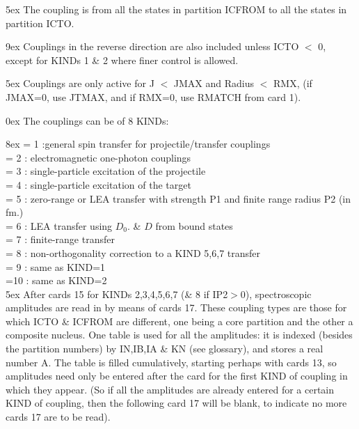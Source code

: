 \documentclass[11pt]{article}
\begin{document}
\hangindent 5ex
The coupling is from all the states in partition ICFROM
to all the states in partition ICTO.

\hangindent 9ex
Couplings in the reverse direction are also included unless
ICTO $<$ 0, except for KINDs 1 \& 2 where finer control is allowed.

\hangindent 5ex
Couplings are only active for J $<$ JMAX and Radius $<$ RMX,
(if JMAX=0, use JTMAX, and if RMX=0, use  RMATCH from card 1).

\bigskip

\hangindent 0ex
The couplings can be of 8 KINDs:

\hangindent 8ex
            = 1 :general spin transfer for projectile/transfer couplings\\
            = 2 :  electromagnetic one-photon couplings\\
            = 3 : single-particle excitation of the projectile\\
            = 4 : single-particle excitation of the target\\
            = 5 : zero-range or LEA transfer with strength P1 and
finite range radius P2 (in fm.)\\
            = 6 : LEA transfer using $D_0$. \& $D$ from bound states\\
            = 7 : finite-range transfer\\
            = 8 : non-orthogonality correction to a KIND 5,6,7 transfer\\
            = 9 : same as KIND=1\\
            =10 : same as KIND=2\\

\hangindent 5ex
After cards 15 for KINDs 2,3,4,5,6,7 (\& 8 if IP2$>$0),
spectroscopic amplitudes are read in by means of cards 17.
These coupling types are those for which ICTO \& ICFROM are
different, one being a core partition and the other a composite
nucleus. One table is used for all the amplitudes: it is indexed
(besides the partition numbers) by IN,IB,IA \& KN (see glossary),
and stores a real number A.
The table is filled cumulatively,
starting perhaps with cards 13,
so amplitudes need only be
entered after the card for the first KIND of coupling in which
they appear.
(So if all the amplitudes are already entered for a certain KIND
of coupling, then the following card 17 will be blank, to indicate
no more cards 17 are to be read).

\bigskip
\end{document}
